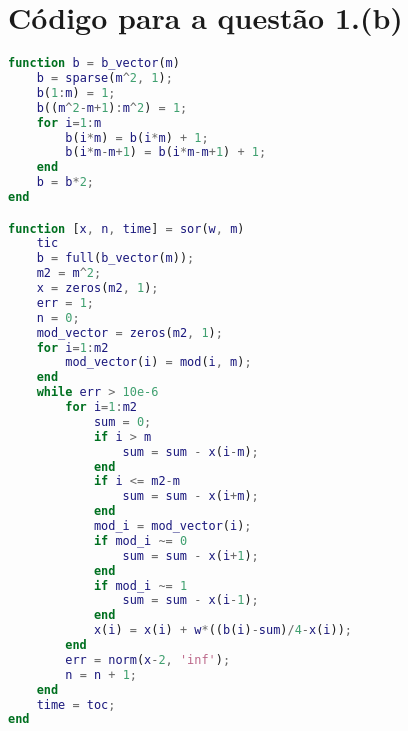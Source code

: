 \documentclass{article}
\begin{document}
    \appendix

    \section{Código para a questão 1.(b)}
        \label{appendix:a}

        \begin{lstlisting}[language=Matlab]
function b = b_vector(m)
    b = sparse(m^2, 1);
    b(1:m) = 1;
    b((m^2-m+1):m^2) = 1;
    for i=1:m
        b(i*m) = b(i*m) + 1;
        b(i*m-m+1) = b(i*m-m+1) + 1;
    end
    b = b*2;
end

function [x, n, time] = sor(w, m)
    tic
    b = full(b_vector(m));
    m2 = m^2;
    x = zeros(m2, 1);
    err = 1;
    n = 0;
    mod_vector = zeros(m2, 1);
    for i=1:m2
        mod_vector(i) = mod(i, m);
    end
    while err > 10e-6
        for i=1:m2
            sum = 0;
            if i > m
                sum = sum - x(i-m);
            end
            if i <= m2-m
                sum = sum - x(i+m);
            end
            mod_i = mod_vector(i);
            if mod_i ~= 0
                sum = sum - x(i+1);
            end
            if mod_i ~= 1
                sum = sum - x(i-1);
            end
            x(i) = x(i) + w*((b(i)-sum)/4-x(i));
        end
        err = norm(x-2, 'inf');
        n = n + 1;
    end
    time = toc;
end
        \end{lstlisting}
\end{document}
